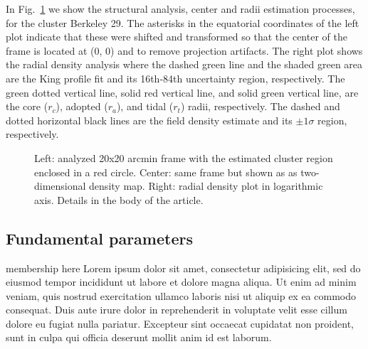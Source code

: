 \documentclass[draft]{aa}
\begin{document}
  In Fig.~\ref{fig:BER29_struct} we show the structural analysis, center and
  radii estimation processes, for the cluster Berkeley 29. The asterisks in the
  equatorial coordinates of the left plot indicate that these were shifted
  and transformed so that the center of the frame is located at (0, 0) and to
  remove projection artifacts. The right plot shows the radial density analysis
  where the dashed green line and the shaded green area are the King profile fit
  and its 16th-84th uncertainty region, respectively. The green dotted vertical
  line, solid red vertical line, and solid green vertical line, are the core 
  ($r_{c}$), adopted ($r_{a}$), and tidal ($r_{t}$) radii, respectively. The
  dashed and dotted horizontal black lines are the field density estimate and
  its $\pm1\sigma$ region, respectively.

  \begin{figure}
   \caption{Left: analyzed 20x20 arcmin frame with the estimated cluster region
   enclosed in a red circle. Center: same frame but shown as as two-dimensional
   density map. Right: radial density plot in logarithmic axis. Details in the
   body of the article.}
   \label{fig:BER29_struct}
  \end{figure}


 \subsection{Fundamental parameters}
  \label{ssec:fund_pars}

  membership here
  Lorem ipsum dolor sit amet, consectetur adipisicing elit, sed do eiusmod
  tempor incididunt ut labore et dolore magna aliqua. Ut enim ad minim veniam,
  quis nostrud exercitation ullamco laboris nisi ut aliquip ex ea commodo
  consequat. Duis aute irure dolor in reprehenderit in voluptate velit esse
  cillum dolore eu fugiat nulla pariatur. Excepteur sint occaecat cupidatat non
  proident, sunt in culpa qui officia deserunt mollit anim id est laborum.
\end{document}
